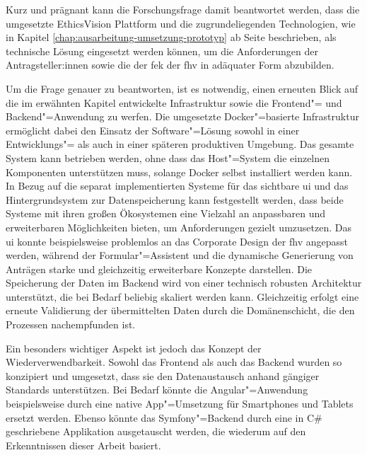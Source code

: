\documentclass[a4paper,12pt,twoside]{scrreprt}
\begin{document}
\medskip

Kurz und prägnant kann die Forschungsfrage damit beantwortet werden, dass die umgesetzte EthicsVision Plattform und die zugrundeliegenden Technologien, wie in Kapitel \ref{chap:ausarbeitung-umsetzung-prototyp} ab Seite \pageref{chap:ausarbeitung-umsetzung-prototyp} beschrieben, als technische Lösung eingesetzt werden können, um die Anforderungen der Antragsteller:innen sowie die der \acl{fek} der \acl{fhv} in adäquater Form abzubilden.

\smallskip

Um die Frage genauer zu beantworten, ist es notwendig, einen erneuten Blick auf die im erwähnten Kapitel entwickelte Infrastruktur sowie die Frontend"= und Backend"=Anwendung zu werfen. Die umgesetzte Docker"=basierte Infrastruktur ermöglicht dabei den Einsatz der Software"=Lösung sowohl in einer Entwicklungs"= als auch in einer späteren produktiven Umgebung. Das gesamte System kann betrieben werden, ohne dass das Host"=System die einzelnen Komponenten unterstützen muss, solange Docker selbst installiert werden kann. In Bezug auf die separat implementierten Systeme für das sichtbare \ac{ui} und das Hintergrundsystem zur Datenspeicherung kann festgestellt werden, dass beide Systeme mit ihren großen Ökosystemen eine Vielzahl an anpassbaren und erweiterbaren Möglichkeiten bieten, um Anforderungen gezielt umzusetzen. Das \ac{ui} konnte beispielsweise problemlos an das Corporate Design der \ac{fhv} angepasst werden, während der Formular"=Assistent und die dynamische Generierung von Anträgen starke und gleichzeitig erweiterbare Konzepte darstellen. Die Speicherung der Daten im Backend wird von einer technisch robusten Architektur unterstützt, die bei Bedarf beliebig skaliert werden kann. Gleichzeitig erfolgt eine erneute Validierung der übermittelten Daten durch die Domänenschicht, die den Prozessen nachempfunden ist.

Ein besonders wichtiger Aspekt ist jedoch das Konzept der Wiederverwendbarkeit. Sowohl das Frontend als auch das Backend wurden so konzipiert und umgesetzt, dass sie den Datenaustausch anhand gängiger Standards unterstützen. Bei Bedarf könnte die Angular"=Anwendung beispielsweise durch eine native App"=Umsetzung für Smartphones und Tablets ersetzt werden. Ebenso könnte das Symfony"=Backend durch eine in C\# geschriebene Applikation ausgetauscht werden, die wiederum auf den Erkenntnissen dieser Arbeit basiert.

\medskip
\end{document}
